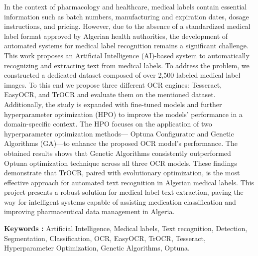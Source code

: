 \begin{comment}
Experimental evaluations demonstrate the superior performance of the VisionAI-based approach, achieving a remarkable accuracy of approximately 95.79\% in the detection and extraction of their content. This research presents a promising solution to the lack of automated recognition systems for medical labels in Algeria, providing a foundation for the implementation of efficient and reliable tools for medication management and classification. %
\end{comment}
In the context of pharmacology and healthcare, medical labels contain essential information such as batch numbers, manufacturing and expiration dates, dosage instructions, and pricing. However, due to the absence of a standardized medical label format approved by Algerian health authorities, the development of automated systems for medical label recognition remains a significant challenge.
This work proposes an Artificial Intelligence (AI)-based system to automatically recognizing and extracting text from medical labels. To address the problem, we constructed a dedicated dataset composed of over 2,500 labeled medical label images. To this end we propose three different OCR engines: Tesseract, EasyOCR, and TrOCR and evaluate them on the mentioned dataset. Additionally, the study is expanded with fine-tuned models and further hyperparameter optimization (HPO) to improve the models' performance in a domain-specific context.
The HPO focuses on the application of two hyperparameter optimization methods— Optuna Configurator and Genetic Algorithms (GA)—to enhance the proposed OCR model's performance. %
The obtained results shows that Genetic Algorithms consistently outperformed Optuna optimization technique across all three OCR models.
These findings demonstrate that TrOCR, paired with evolutionary optimization, is the most effective approach for automated text recognition in Algerian medical labels.
This project presents a robust solution for medical label text extraction, paving the way for intelligent systems capable of assisting medication classification and improving pharmaceutical data management in Algeria.
\vspace{1cm}


{\textbf{Keywords :}}
Artificial Intelligence, Medical labels, Text recognition, Detection, Segmentation, Classification, OCR, EasyOCR, TrOCR, Tesseract, Hyperparameter Optimization, Genetic Algorithms, Optuna.
\\